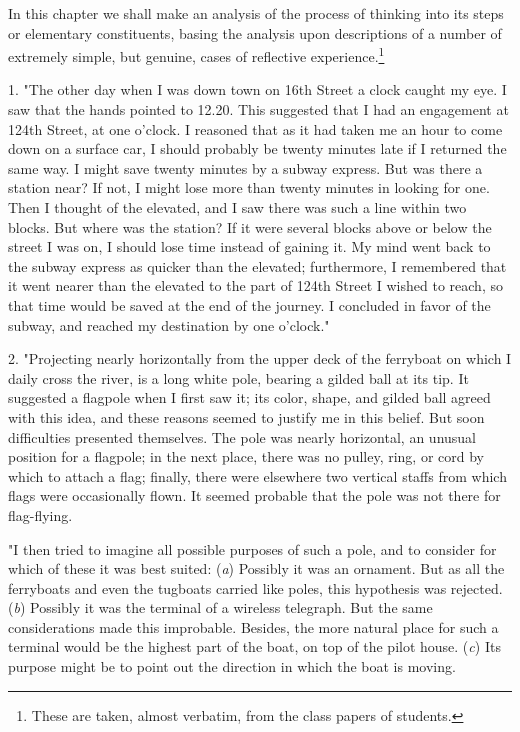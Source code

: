 \documentclass[showtrims,ustradepaper]{memoir}
\begin{document}
In this chapter we shall make an analysis of the process of thinking
into its steps or elementary constituents, basing the analysis upon
descriptions of a number of extremely simple, but genuine, cases of
reflective
experience.\footnote{
These are taken, almost verbatim, from the class papers of students.
}


1. "The other day when I was down town on 16th Street a clock caught my
eye. I saw that the hands pointed to 12.20. This suggested that I had an
engagement at 124th Street, at one o'clock. I reasoned
that
as it had taken me an hour to come down on a surface car, I should
probably be twenty minutes late if I returned the same way. I might save
twenty minutes by a subway express. But was there a station near? If
not, I might lose more than twenty minutes in looking for one. Then I
thought of the elevated, and I saw there was such a line within two
blocks. But where was the station? If it were several blocks above or
below the street I was on, I should lose time instead of gaining it. My
mind went back to the subway express as quicker than the elevated;
furthermore, I remembered that it went nearer than the elevated to the
part of 124th Street I wished to reach, so that time would be saved at
the end of the journey. I concluded in favor of the subway, and reached
my destination by one o'clock."


2. "Projecting nearly horizontally from the upper deck of the ferryboat
on which I daily cross the river, is a long white pole, bearing a gilded
ball at its tip. It suggested a flagpole when I first saw it; its color,
shape, and gilded ball agreed with this idea, and these reasons seemed
to justify me in this belief. But soon difficulties presented
themselves. The pole was nearly horizontal, an unusual position for a
flagpole; in the next place, there was no pulley, ring, or cord by which
to attach a flag; finally, there were elsewhere two vertical staffs from
which flags were occasionally flown. It seemed probable that the pole
was not there for flag-flying.

"I then tried to imagine all possible purposes of such a pole, and to
consider for which of these it was best suited: (\emph{a}) Possibly it
was an ornament. But as all the ferryboats and even the tugboats carried
like
poles,
this hypothesis was rejected. (\emph{b}) Possibly it was the terminal of
a wireless telegraph. But the same considerations made this improbable.
Besides, the more natural place for such a terminal would be the highest
part of the boat, on top of the pilot house. (\emph{c}) Its purpose
might be to point out the direction in which the boat is moving.
\end{document}
